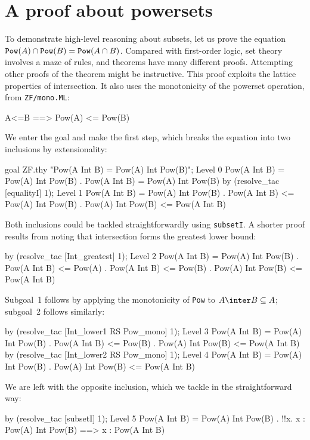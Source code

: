 \section{A proof about powersets}
To demonstrate high-level reasoning about subsets, let us prove the
equation ${{\tt Pow}(A)\cap {\tt Pow}(B)}= {\tt Pow}(A\cap B)$.  Compared
with first-order logic, set theory involves a maze of rules, and theorems
have many different proofs.  Attempting other proofs of the theorem might
be instructive.  This proof exploits the lattice properties of
intersection.  It also uses the monotonicity of the powerset operation,
from {\tt ZF/mono.ML}:
\begin{ttbox}
      A<=B ==> Pow(A) <= Pow(B)
\end{ttbox}
We enter the goal and make the first step, which breaks the equation into
two inclusions by extensionality:
\begin{ttbox}
goal ZF.thy "Pow(A Int B) = Pow(A) Int Pow(B)";
{\out Level 0}
{\out Pow(A Int B) = Pow(A) Int Pow(B)}
{. Pow(A Int B) = Pow(A) Int Pow(B)}
by (resolve_tac [equalityI] 1);
{\out Level 1}
{\out Pow(A Int B) = Pow(A) Int Pow(B)}
{. Pow(A Int B) <= Pow(A) Int Pow(B)}
{. Pow(A) Int Pow(B) <= Pow(A Int B)}
\end{ttbox}
Both inclusions could be tackled straightforwardly using {\tt subsetI}.
A shorter proof results from noting that intersection forms the greatest
lower bound:
\begin{ttbox}
by (resolve_tac [Int_greatest] 1);
{\out Level 2}
{\out Pow(A Int B) = Pow(A) Int Pow(B)}
{. Pow(A Int B) <= Pow(A)}
{. Pow(A Int B) <= Pow(B)}
{. Pow(A) Int Pow(B) <= Pow(A Int B)}
\end{ttbox}
Subgoal~1 follows by applying the monotonicity of {\tt Pow} to $A\inter
B\subseteq A$; subgoal~2 follows similarly:
\begin{ttbox}
by (resolve_tac [Int_lower1 RS Pow_mono] 1);
{\out Level 3}
{\out Pow(A Int B) = Pow(A) Int Pow(B)}
{. Pow(A Int B) <= Pow(B)}
{. Pow(A) Int Pow(B) <= Pow(A Int B)}
by (resolve_tac [Int_lower2 RS Pow_mono] 1);
{\out Level 4}
{\out Pow(A Int B) = Pow(A) Int Pow(B)}
{. Pow(A) Int Pow(B) <= Pow(A Int B)}
\end{ttbox}
We are left with the opposite inclusion, which we tackle in the
straightforward way:
\begin{ttbox}
by (resolve_tac [subsetI] 1);
{\out Level 5}
{\out Pow(A Int B) = Pow(A) Int Pow(B)}
{. !!x. x : Pow(A) Int Pow(B) ==> x : Pow(A Int B)}
\end{ttbox}
